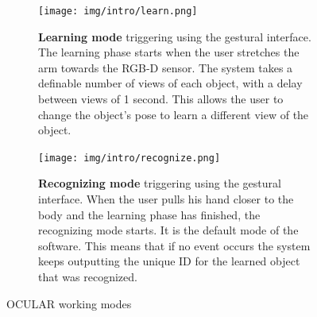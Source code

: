 \begin{figure}[H]
   \centering
   \begin{subfigure}[H]{0.45\textwidth}
       \centering
		\texttt{[image: img/intro/learn.png]}
		\caption[Learning Mode Triggering]{\textbf{Learning mode} triggering using the gestural interface. The learning phase starts when the user stretches the arm towards the RGB-D sensor. The system takes a definable number of views of each object, with a delay between views of 1 second. This allows the user to change the object's pose to learn a different view of the object. }    	 
		\label{learn}
   \end{subfigure}
   \hfill
   \begin{subfigure}[H]{0.45\textwidth}
       \centering
    	\texttt{[image: img/intro/recognize.png]}
		\caption[Recognizing Mode Triggering]{\textbf{Recognizing mode} triggering using the gestural interface. When the user pulls his hand closer to the body and the learning phase has finished, the recognizing mode starts. It is the default mode of the software. This means that if no event occurs the system keeps outputting the unique ID for the learned object that was recognized. }      
		\label{recognize}

   \end{subfigure}
   \caption{OCULAR working modes}
   \label{}
\end{figure}









